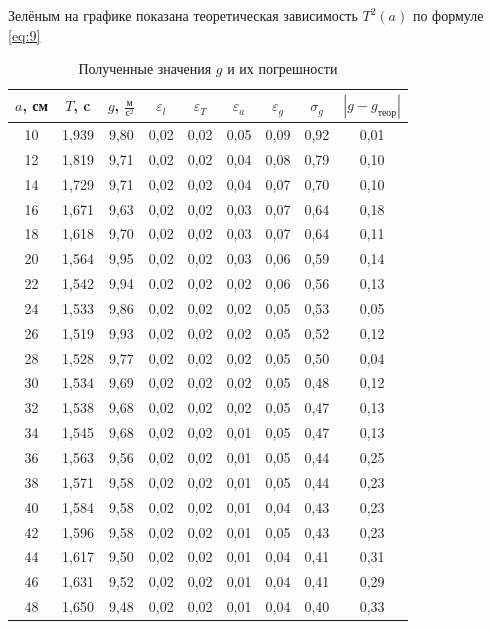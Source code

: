 \documentclass[a4paper,12pt]{article}
\begin{document}
	\noindent
	Зелёным на графике показана теоретическая зависимость $T^2(a)$ по формуле \eqref{eq:9}\\
	
	\vspace{-5mm}
	
	\begin{table}[H]
		\centering
		\caption{Полученные значения $g$ и их погрешности}
		\vspace{2mm}
		\begin{tabular}{|c|c|c|c|c|c|c|c|c|}
			\hline
			$a$, см & $T$, c & $g$, $\frac{\text{м}}{\text{с}^2}$ & $\varepsilon_l$ & $\varepsilon_T$ & $\varepsilon_a$ & $\varepsilon_g$ & $\sigma_g$ & $|g-g_\text{теор}|$ \\
			\hline
			10 & 1,939 & 9,80 & 0,02 & 0,02 & 0,05 & 0,09 & 0,92 & 0,01 \\
			\hline
			12 & 1,819 & 9,71 & 0,02 & 0,02 & 0,04 & 0,08 & 0,79 & 0,10 \\
			\hline
			14 & 1,729 & 9,71 & 0,02 & 0,02 & 0,04 & 0,07 & 0,70 & 0,10 \\
			\hline
			16 & 1,671 & 9,63 & 0,02 & 0,02 & 0,03 & 0,07 & 0,64 & 0,18 \\
			\hline
			18 & 1,618 & 9,70 & 0,02 & 0,02 & 0,03 & 0,07 & 0,64 & 0,11 \\
			\hline
			20 & 1,564 & 9,95 & 0,02 & 0,02 & 0,03 & 0,06 & 0,59 & 0,14 \\
			\hline
			22 & 1,542 & 9,94 & 0,02 & 0,02 & 0,02 & 0,06 & 0,56 & 0,13 \\
			\hline
			24 & 1,533 & 9,86 & 0,02 & 0,02 & 0,02 & 0,05 & 0,53 & 0,05 \\
			\hline
			26 & 1,519 & 9,93 & 0,02 & 0,02 & 0,02 & 0,05 & 0,52 & 0,12 \\
			\hline
			28 & 1,528 & 9,77 & 0,02 & 0,02 & 0,02 & 0,05 & 0,50 & 0,04 \\
			\hline
			30 & 1,534 & 9,69 & 0,02 & 0,02 & 0,02 & 0,05 & 0,48 & 0,12 \\
			\hline
			32 & 1,538 & 9,68 & 0,02 & 0,02 & 0,02 & 0,05 & 0,47 & 0,13 \\
			\hline
			34 & 1,545 & 9,68 & 0,02 & 0,02 & 0,01 & 0,05 & 0,47 & 0,13 \\
			\hline
			36 & 1,563 & 9,56 & 0,02 & 0,02 & 0,01 & 0,05 & 0,44 & 0,25 \\
			\hline
			38 & 1,571 & 9,58 & 0,02 & 0,02 & 0,01 & 0,05 & 0,44 & 0,23 \\
			\hline
			40 & 1,584 & 9,58 & 0,02 & 0,02 & 0,01 & 0,04 & 0,43 & 0,23 \\
			\hline
			42 & 1,596 & 9,58 & 0,02 & 0,02 & 0,01 & 0,05 & 0,43 & 0,23 \\
			\hline
			44 & 1,617 & 9,50 & 0,02 & 0,02 & 0,01 & 0,04 & 0,41 & 0,31 \\
			\hline
			46 & 1,631 & 9,52 & 0,02 & 0,02 & 0,01 & 0,04 & 0,41 & 0,29 \\
			\hline
			48 & 1,650 & 9,48 & 0,02 & 0,02 & 0,01 & 0,04 & 0,40 & 0,33 \\
			\hline
		\end{tabular}
	\end{table}
\end{document}
